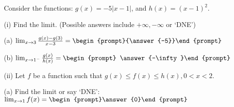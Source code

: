 \documentclass{ximera}
\author{Tom Dinitz and Nela Lakos}
\begin{document}
\begin{exercise}

Consider the functions: $g(x)=-5|x-1|$, and $h(x)=(x-1)^2$.

(i) Find the limit. (Possible answers include $+\infty, -\infty$ or `DNE')

(a) $\lim_{x\to 3} \frac{g(x)-g(3)}{x-3}=\begin{prompt}{\answer{-5}}\end{prompt}$

(b) $\lim_{x\to 1^-} \frac{g(x)}{h(x)}=\begin{prompt} \answer{-\infty}\end{prompt}$

(ii) Let $f$ be a function such that $g(x)\leq f(x)\leq h(x), 0<x<2$.

(a) Find the limit or say `DNE': $\lim_{x\to 1} f(x)= \begin{prompt}\answer{0}\end{prompt}$

\end{exercise}
\end{document}
